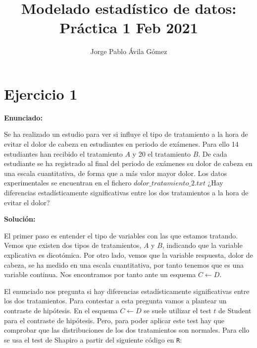 \documentclass[a4paper]{article}
\title{Modelado estadístico de datos: Práctica 1 Feb 2021 }
\author{Jorge Pablo Ávila Gómez \date{} }
\begin{document}
\renewcommand{\tablename}{Tabla} 
\maketitle



\section{Ejercicio 1}
\textbf{Enunciado:}\par
Se ha realizado un estudio para ver si influye el tipo de tratamiento a la hora de evitar el dolor de cabeza en estudiantes en periodo de exámenes. Para ello 14 estudiantes han recibido el tratamiento $A$ y 20 el tratamiento $B$. De cada estudiante se ha registrado al final del periodo de exámenes su dolor de cabeza en una escala cuantitativa, de forma que a más valor mayor dolor. Los datos experimentales se encuentran en el fichero $dolor\_tratamiento\_2.txt$ ¿Hay diferencias estadísticamente significativas entre los dos tratamientos a la hora de evitar el dolor? \par
\textbf{Solución:}\par
El primer paso es entender el tipo de variables con las que estamos tratando. Vemos que existen dos tipos de tratamientos, $A$ y $B$, indicando que la variable explicativa es dicotómica. Por otro lado, vemos que la variable respuesta, dolor de cabeza, se ha medido en una escala cuantitativa, por tanto tenemos que es una variable continua. Nos encontramos por tanto ante un esquema $C \leftarrow D$. \par
El enunciado nos pregunta si hay diferencias estadísticamente significativas entre los dos tratamientos. Para contestar a esta pregunta vamos a plantear un contraste de hipótesis.
En el esquema $C \leftarrow D$ se suele utilizar el test $t$ de Student para el contraste de hipótesis. Pero, para poder aplicar este test hay que comprobar que las distribuciones de los dos tratamientos son normales. Para ello se usa el test de Shapiro a partir del siguiente código en \verb|R|:
\end{document}
